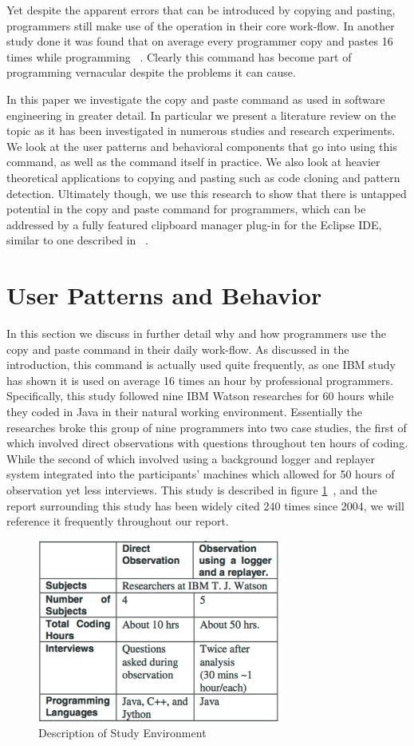 \documentclass{acm_proc_article-sp}
\begin{document}
Yet despite the apparent errors that can be introduced by copying and pasting, programmers still make use of the operation in their core work-flow. In another study done it was found that on average every programmer copy and pastes 16 times while programming ~\cite{ooplCP}. Clearly this command has become part of programming vernacular despite the problems it can cause.

In this paper we investigate the copy and paste command as used in software engineering in greater detail. In particular we present a literature review on the topic as it has been investigated in numerous studies and research experiments. We look at the user patterns and behavioral components that go into using this command, as well as the command itself in practice. We also look at heavier theoretical applications to copying and pasting such as code cloning and pattern detection. Ultimately though, we use this research to show that there is untapped potential in the copy and paste command for programmers, which can be addressed by a fully featured clipboard manager plug-in for the Eclipse IDE, similar to one described in ~\cite{ooplCP}.

\section{User Patterns and Behavior}
In this section we discuss in further detail why and how programmers use the copy and paste command in their daily work-flow. As discussed in the introduction, this command is actually used quite frequently, as one IBM study has shown it is used on average 16 times an hour by professional programmers. Specifically, this study followed nine IBM Watson researches for 60 hours while they coded in Java in their natural working environment. Essentially the researches broke this group of nine programmers into two case studies, the first of which involved direct observations with questions throughout ten hours of coding. While the second of which involved using a background logger and replayer system integrated into the participants' machines which allowed for 50 hours of observation yet less interviews. This study is described in figure  \ref{fig:oopl}~\cite{ooplCP}, and the report surrounding this study has been widely cited 240 times since 2004, we will reference it frequently throughout our report.

 \begin{figure}[h]
 \centering
\includegraphics[width=8cm]{ooplStudy}
\caption{Description of Study Environment}
    \label{fig:oopl}
\end{figure}
\end{document}
